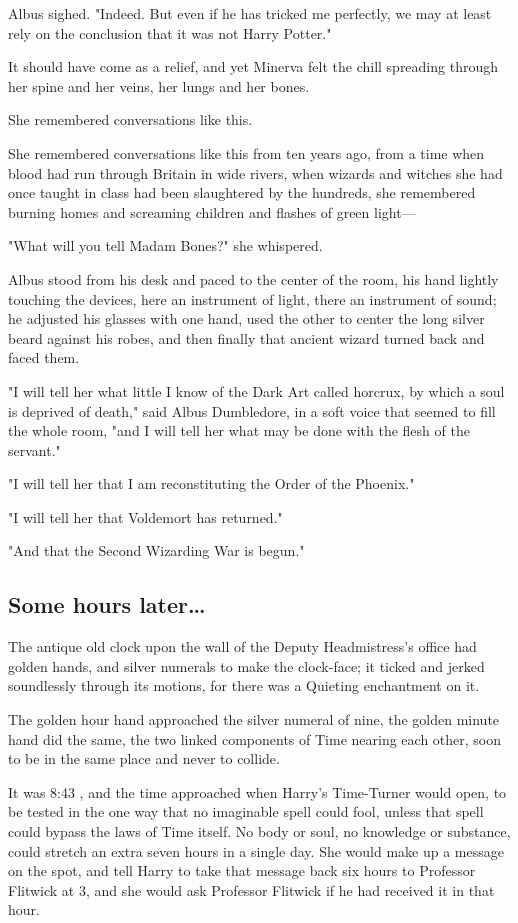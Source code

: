 Albus sighed. "Indeed. But even if he has tricked me perfectly, we may at least 
rely on the conclusion that it was not Harry Potter."

It should have come as a relief, and yet Minerva felt the chill spreading 
through her spine and her veins, her lungs and her bones.

She remembered conversations like this.

She remembered conversations like this from ten years ago, from a time when 
blood had run through Britain in wide rivers, when wizards and witches she had 
once taught in class had been slaughtered by the hundreds, she remembered 
burning homes and screaming children and flashes of green light---

"What will you tell Madam Bones?" she whispered.

Albus stood from his desk and paced to the center of the room, his hand lightly 
touching the devices, here an instrument of light, there an instrument of 
sound; he adjusted his glasses with one hand, used the other to center the long 
silver beard against his robes, and then finally that ancient wizard turned 
back and faced them.

"I will tell her what little I know of the Dark Art called horcrux, by which a 
soul is deprived of death," said Albus Dumbledore, in a soft voice that seemed 
to fill the whole room, "and I will tell her what may be done with the flesh of 
the servant."

"I will tell her that I am reconstituting the Order of the Phoenix."

"I will tell her that Voldemort has returned."

"And that the Second Wizarding War is begun."
\sbreak
\subsection{Some hours later{\ldots}}

The antique old clock upon the wall of the Deputy Headmistress's office had 
golden hands, and silver numerals to make the clock-face; it ticked and jerked 
soundlessly through its motions, for there was a Quieting enchantment on it.

The golden hour hand approached the silver numeral of nine, the golden minute 
hand did the same, the two linked components of Time nearing each other, soon 
to be in the same place and never to collide.

It was 8:43 \PM, and the time approached when Harry's Time-Turner would open, to 
be tested in the one way that no imaginable spell could fool, unless that spell 
could bypass the laws of Time itself. No body or soul, no knowledge or 
substance, could stretch an extra seven hours in a single day. She would make 
up a message on the spot, and tell Harry to take that message back six hours to 
Professor Flitwick at 3\PM, and she would ask Professor Flitwick if he had 
received it in that hour.

